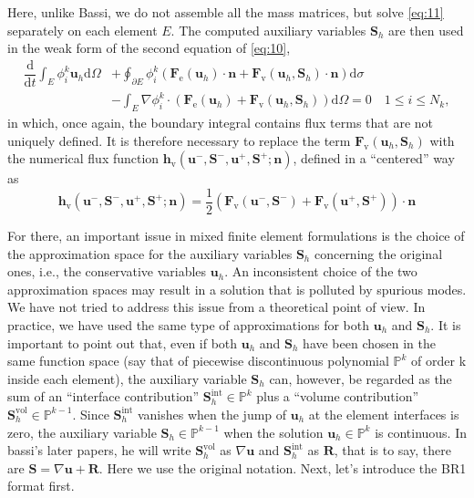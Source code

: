 \documentclass{develop-note}
\begin{document}
Here, unlike Bassi, we do not assemble all the mass matrices, but solve \autoref{eq:11} separately on each element $E$. The computed auxiliary variables $\mathbf{S}_{h}$ are then used in the weak form of the second equation of \autoref{eq:10},
\begin{equation}
  \label{eq:13}
  \begin{aligned}
    \dfrac{\mathrm{d}}{\mathrm{d}t}\int_{E}\phi_{i}^{k}\mathbf{u}_{h}\mathrm{d}\Omega &+\oint_{\partial E}\phi_{i}^{k}(\mathbf{F}_{\mathrm{e}}(\mathbf{u}_{h})\cdot\mathbf{n}+\mathbf{F}_{\mathrm{v}}(\mathbf{u}_{h},\mathbf{S}_{h})\cdot\mathbf{n})\mathrm{d}\sigma\\
    &-\int_{E}\nabla\phi_{i}^{k}\cdot(\mathbf{F}_{\mathrm{e}}(\mathbf{u}_{h})+\mathbf{F}_{\mathrm{v}}(\mathbf{u}_{h},\mathbf{S}_{h}))\mathrm{d}\Omega=0\quad 1\leqslant i\leqslant N_{k},
  \end{aligned}
\end{equation}
in which, once again, the boundary integral contains flux terms that are not uniquely defined. It is therefore necessary to replace the term $\mathbf{F}_{\mathrm{v}}(\mathbf{u}_{h},\mathbf{S}_{h})$ with the numerical flux function $\mathbf{h}_{\mathrm{v}}(\mathbf{u}^{-},\mathbf{S}^{-},\mathbf{u}^{+},\mathbf{S}^{+};\mathbf{n})$, defined in a ``centered'' way as
\begin{equation}
  \mathbf{h}_{\mathrm{v}}(\mathbf{u}^{-},\mathbf{S}^{-},\mathbf{u}^{+},\mathbf{S}^{+};\mathbf{n})=\dfrac{1}{2}(\mathbf{F}_{\mathrm{v}}(\mathbf{u}^{-},\mathbf{S}^{-})+\mathbf{F}_{\mathrm{v}}(\mathbf{u}^{+},\mathbf{S}^{+}))\cdot\mathbf{n}
\end{equation}

For there, an important issue in mixed finite element formulations is the choice of the approximation space for the auxiliary variables $\mathbf{S}_{h}$ concerning the original ones, i.e., the conservative variables $\mathbf{u}_{h}$. An inconsistent choice of the two approximation spaces may result in a solution that is polluted by spurious modes. We have not tried to address this issue from a theoretical point of view. In practice, we have used the same type of approximations for both $\mathbf{u}_{h}$ and $\mathbf{S}_{h}$. It is important to point out that, even if both $\mathbf{u}_{h}$ and $\mathbf{S}_{h}$ have been chosen in the same function space (say that of piecewise discontinuous polynomial $\mathbb{P}^{k}$ of order k inside each element), the auxiliary variable $\mathbf{S}_{h}$ can, however, be regarded as the sum of an ``interface contribution'' $\mathbf{S}_{h}^{\mathrm{int}}\in\mathbb{P}^{k}$ plus a ``volume contribution'' $\mathbf{S}_{h}^{\mathrm{vol}}\in\mathbb{P}^{k-1}$. Since $\mathbf{S}_{h}^{\mathrm{int}}$ vanishes when the jump of $\mathbf{u}_{h}$ at the element interfaces is zero, the auxiliary variable $\mathbf{S}_{h}\in\mathbb{P}^{k-1}$ when the solution $\mathbf{u}_{h}\in\mathbb{P}^{k}$ is continuous. In bassi's later papers, he will write $\mathbf{S}_{h}^{\mathrm{vol}}$ as $\nabla\mathbf{u}$ and $\mathbf{S}_{h}^{\mathrm{int}}$ as $\mathbf{R}$, that is to say, there are $\mathbf{S}=\nabla\mathbf{u}+\mathbf{R}$. Here we use the original notation. Next, let's introduce the BR1 format first.
\end{document}
